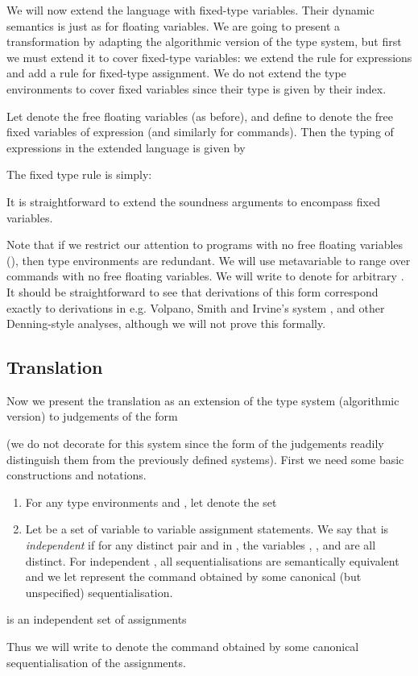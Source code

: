 \documentclass{sigplanconf}
\begin{document}
\begin{table}
We will now extend the language with fixed-type variables.
Their dynamic semantics is just as for floating variables.
We are going to present a transformation by adapting the algorithmic
version of the type system, but first we must
extend it to cover fixed-type variables:
we extend the rule for expressions
and add a rule for fixed-type assignment.  We do not extend
the type environments to cover fixed variables since their type is
given by their index.

Let  denote the free floating variables (as before), and 
define  to denote the free fixed variables of expression  (and similarly for commands). 
Then the typing of expressions in the extended language is given by 

The fixed type rule is simply:

It is straightforward to extend the soundness arguments to encompass fixed variables.

Note that if we restrict our attention to programs with no free
floating variables (), then type environments are
redundant. We will use metavariable  to range over commands with no free floating variables. 
We will write  to denote
 for arbitrary .
It should be straightforward to
see that derivations of this form correspond exactly to derivations in
e.g. Volpano, Smith and Irvine's system \cite{Volpano:Smith:Irvine:Sound}, and other
Denning-style analyses, although we will not prove this formally.

\subsection{Translation}
Now we present the translation as an extension of the type system (algorithmic version) 
to judgements of the form

(we do not decorate  for this system since the form of the judgements
readily distinguish them from the previously defined systems).
First we need some basic constructions and notations. 
\begin{definition}\label{def:fassign}
\mbox{}\begin{enumerate}
\item 
For any type environments  and ,
let  denote the set

\item 
Let  be a set of variable to variable assignment statements.
We say that  is \emph{independent} if for any distinct pair 
 and  in ,
the variables
, ,  and  are all distinct.
For independent , all sequentialisations
are semantically equivalent and we
let  represent the command obtained by 
some canonical (but unspecified) sequentialisation.
\end{enumerate}
\end{definition}
\begin{lemma} 
 is an independent set of assignments
\end{lemma}
Thus we will write  to denote the command obtained by some canonical sequentialisation of the assignments.


\end{table}
\end{document}
